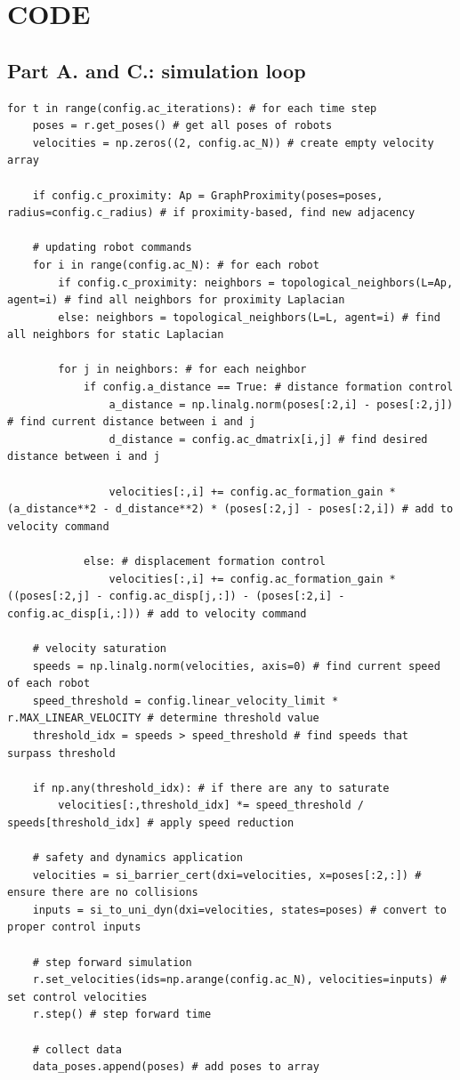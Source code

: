 \documentclass[11pt]{article}
\newcommand{\appendixpagenumbering}{\clearpage\pagenumbering{arabic}\renewcommand{\thepage}{A-\arabic{page}}}
\begin{document}

\appendix\appendixpagenumbering
\section{CODE}\label{app:code}
\subsection{Part A. and C.: simulation loop}
\begin{verbatim}
for t in range(config.ac_iterations): # for each time step
    poses = r.get_poses() # get all poses of robots
    velocities = np.zeros((2, config.ac_N)) # create empty velocity array

    if config.c_proximity: Ap = GraphProximity(poses=poses, radius=config.c_radius) # if proximity-based, find new adjacency

    # updating robot commands
    for i in range(config.ac_N): # for each robot
        if config.c_proximity: neighbors = topological_neighbors(L=Ap, agent=i) # find all neighbors for proximity Laplacian
        else: neighbors = topological_neighbors(L=L, agent=i) # find all neighbors for static Laplacian

        for j in neighbors: # for each neighbor
            if config.a_distance == True: # distance formation control
                a_distance = np.linalg.norm(poses[:2,i] - poses[:2,j]) # find current distance between i and j
                d_distance = config.ac_dmatrix[i,j] # find desired distance between i and j

                velocities[:,i] += config.ac_formation_gain * (a_distance**2 - d_distance**2) * (poses[:2,j] - poses[:2,i]) # add to velocity command

            else: # displacement formation control
                velocities[:,i] += config.ac_formation_gain * ((poses[:2,j] - config.ac_disp[j,:]) - (poses[:2,i] - config.ac_disp[i,:])) # add to velocity command

    # velocity saturation
    speeds = np.linalg.norm(velocities, axis=0) # find current speed of each robot
    speed_threshold = config.linear_velocity_limit * r.MAX_LINEAR_VELOCITY # determine threshold value
    threshold_idx = speeds > speed_threshold # find speeds that surpass threshold
        
    if np.any(threshold_idx): # if there are any to saturate
        velocities[:,threshold_idx] *= speed_threshold / speeds[threshold_idx] # apply speed reduction

    # safety and dynamics application
    velocities = si_barrier_cert(dxi=velocities, x=poses[:2,:]) # ensure there are no collisions
    inputs = si_to_uni_dyn(dxi=velocities, states=poses) # convert to proper control inputs

    # step forward simulation
    r.set_velocities(ids=np.arange(config.ac_N), velocities=inputs) # set control velocities
    r.step() # step forward time

    # collect data
    data_poses.append(poses) # add poses to array
\end{verbatim}
\end{document}
